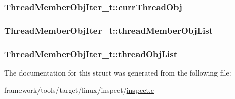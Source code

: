\subsubsection[{\texorpdfstring{curr\+Thread\+Obj}{currThreadObj}}]{ Thread\+Member\+Obj\+Iter\+\_\+t\+::curr\+Thread\+Obj}\hypertarget{struct_thread_member_obj_iter__t_a966e49d77b883c05200a5d02c5869e7f}{}\label{struct_thread_member_obj_iter__t_a966e49d77b883c05200a5d02c5869e7f}
\subsubsection[{\texorpdfstring{thread\+Member\+Obj\+List}{threadMemberObjList}}]{ Thread\+Member\+Obj\+Iter\+\_\+t\+::thread\+Member\+Obj\+List}\hypertarget{struct_thread_member_obj_iter__t_a9ec33dda4e021ea0a6bd56dfee4189ff}{}\label{struct_thread_member_obj_iter__t_a9ec33dda4e021ea0a6bd56dfee4189ff}
\subsubsection[{\texorpdfstring{thread\+Obj\+List}{threadObjList}}]{ Thread\+Member\+Obj\+Iter\+\_\+t\+::thread\+Obj\+List}\hypertarget{struct_thread_member_obj_iter__t_a2057e6b20a4c0d6f737d351a76a33953}{}\label{struct_thread_member_obj_iter__t_a2057e6b20a4c0d6f737d351a76a33953}


The documentation for this struct was generated from the following file\+:\begin{DoxyCompactItemize}
\item 
framework/tools/target/linux/inspect/\hyperlink{inspect_8c}{inspect.\+c}\end{DoxyCompactItemize}
